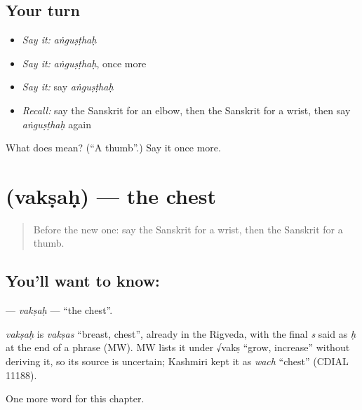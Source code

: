 \subsection*{Your turn}
\begin{itemize}
\raggedright
  \item \emph{Say it:} \emph{aṅguṣṭhaḥ}
  \item \emph{Say it:} \emph{aṅguṣṭhaḥ}, once more
  \item \emph{Say it:} say \emph{aṅguṣṭhaḥ}
  \item \emph{Recall:} say the Sanskrit for an elbow, then the Sanskrit for a wrist, then say \emph{aṅguṣṭhaḥ} again
\end{itemize}

\begin{tcolorbox}[breakable,colback=teal!4,colframe=teal!35!black,title={Before you move on}]
What does  mean? (\textquotedblleft{}A thumb\textquotedblright{}.) Say it once more.
\end{tcolorbox}
\section[\texorpdfstring{\sk{वक्षः} (vakṣaḥ)}{वक्षः (vakṣaḥ)}]{ (vakṣaḥ) — the chest}

\label{lesson:SA-C117-vaksah}



\begin{quote}
Before the new one: say the Sanskrit for a wrist, then the Sanskrit for a thumb.
\end{quote}

\subsection*{You'll want to know: }
\textbf{} — \emph{vakṣaḥ} — \textquotedblleft{}the chest\textquotedblright{}.

\begin{cousinweb}
\emph{vakṣaḥ} is \emph{vakṣas} \textquotedblleft{}breast, chest\textquotedblright{}, already in the Rigveda, with the final \emph{s} said as \emph{ḥ} at the end of a phrase (MW). MW lists it under √vakṣ \textquotedblleft{}grow, increase\textquotedblright{} without deriving it, so its source is uncertain; Kashmiri kept it as \emph{wach} \textquotedblleft{}chest\textquotedblright{} (CDIAL 11188).
\end{cousinweb}

\begin{grammarlens}[title={What you've built}]
One more word for this chapter.
\end{grammarlens}

